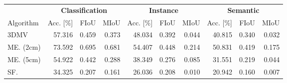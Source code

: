 \begin{tabular}{lrrrrrrrrr}
\toprule
 &  \multicolumn{3}{c}{\textbf{Classification}}&  \multicolumn{3}{c}{\textbf{Instance}}&  \multicolumn{3}{c}{\textbf{Semantic}} \\
Algorithm &  Acc. [\%] &  FIoU &  MIoU&  Acc. [\%] &  FIoU &  MIoU&  Acc. [\%] &  FIoU &  MIoU \\
\midrule
3DMV      &57.316 & 0.459 & 0.373&        48.034 & 0.392 & 0.044&        40.815 & 0.340 & 0.032 \\
ME. (2cm) &73.592 & 0.695 & 0.681&        54.407 & 0.448 & 0.214&        50.831 & 0.419 & 0.175 \\
ME. (5cm) &54.922 & 0.442 & 0.288&        38.349 & 0.276 & 0.085&        31.551 & 0.219 & 0.044 \\
SF.       &34.325 & 0.207 & 0.161&        26.036 & 0.208 & 0.010&        20.942 & 0.160 & 0.007 \\
\bottomrule
\end{tabular}
